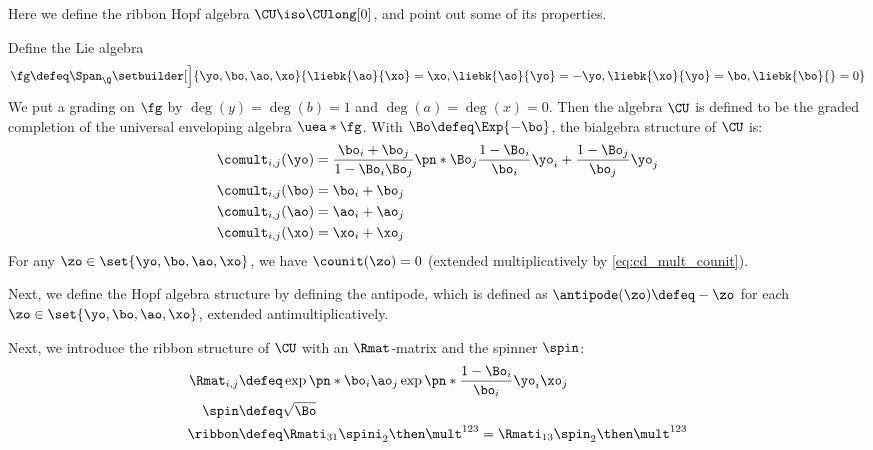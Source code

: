 Here we define the ribbon Hopf algebra $\CU \iso \CUlong[0]$, and point out some
of its properties.

\begin{definition}
Define the Lie algebra
\begin{equation}
\fg \defeq \Span_{\Q}\setbuilder[\Big]{\yo, \bo, \ao, \xo}{
        \liebk{\ao}{\xo} = \xo,
        \liebk{\ao}{\yo} = -\yo,
        \liebk{\xo}{\yo} = \bo,
        \liebk{\bo}{ } = 0
}
\end{equation}
We put a grading on $\fg$ by $\deg(y) = \deg(b) = 1$ and
$\deg(a) = \deg(x) = 0$. Then the algebra $\CU$ is defined to be the graded
completion of the universal enveloping algebra $\uea*{\fg}$.
With $\Bo \defeq \Exp{-\bo}$, the bialgebra structure of $\CU$ is:
\begin{equation}\begin{aligned}
        \comult_{i,j}(\yo) &=
        \frac{\bo_i+\bo_j}{1-\Bo_i\Bo_j} \pn*{
                \Bo_j\frac{1-\Bo_i}{\bo_i}\yo_i+
                \frac{1-\Bo_j}{\bo_j}\yo_j
        }\\
        \comult_{i,j}(\bo) &= \bo_i + \bo_j\\
        \comult_{i,j}(\ao) &= \ao_i + \ao_j\\
        \comult_{i,j}(\xo) &= \xo_i + \xo_j\\
\end{aligned}\end{equation}
For any $\zo\in\set{\yo, \bo, \ao, \xo}$, we have $\counit(\zo)=0$ (extended
multiplicatively by \cref{eq:cd_mult_counit}).

Next, we define the Hopf algebra structure by defining the antipode, which is
defined as $\antipode(\zo) \defeq -\zo$ for each
$\zo\in\set{\yo, \bo, \ao, \xo}$, extended antimultiplicatively.

Next, we introduce the ribbon structure of $\CU$ with an $\Rmat$-matrix and
the spinner $\spin$:
\begin{align}
        \Rmat_{i,j}
                &\defeq \exp\pn*{\bo_i\ao_j}
                        \exp\pn*{\frac{1-\Bo_i}{\bo_i}\yo_i\xo_j}\\
        \spin &\defeq \sqrt{\Bo}\\
        \ribbon
              &\defeq \Rmati_{31}\spini_{2} \then \mult^{123}
              = \Rmati_{13}\spin_{2} \then \mult^{123}
\end{align}
\end{definition}

